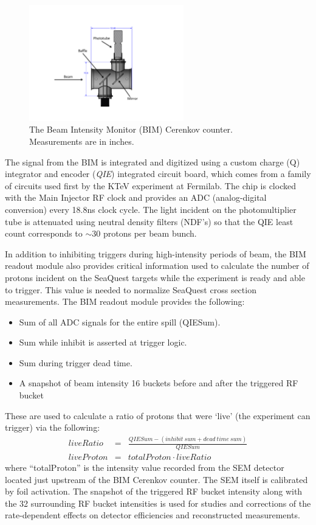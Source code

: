 \begin{figure}
	\begin{center}
		\includegraphics[width=0.6\textwidth]{figures/BIMCerenkov.pdf}
		\caption{The Beam Intensity Monitor (BIM) Cerenkov counter. Measurements are in inches.}
		\label{fig:BIMCerenkov}
	\end{center}
\end{figure}

The signal from the BIM is integrated and digitized using a custom charge (Q) integrator and encoder (\emph{QIE}) integrated circuit board, which comes from a family of circuits used first by the KTeV experiment at Fermilab\cite{QIE}. The chip is clocked with the Main Injector RF clock and provides an ADC (analog-digital conversion) every 18.8ns clock cycle. The light incident on
the photomultiplier tube is attenuated using neutral density filters (NDF's) so that the QIE least count corresponds to
$\sim$30 protons per beam bunch.

In addition to inhibiting triggers during high-intensity periods of beam, the BIM readout module also provides critical
information used to calculate the number of protons incident on the SeaQuest targets while the experiment is ready
and able to trigger. This value is needed to normalize SeaQuest cross section measurements. The BIM readout module provides the following:
\begin{itemize}
\item Sum of all ADC signals for the entire spill (QIESum).
\item Sum while inhibit is asserted at trigger logic.
\item Sum during trigger dead time.
\item A snapshot of beam intensity 16 buckets before and after the triggered RF bucket
\end{itemize}

These are used to calculate a ratio of protons that were `live' (the experiment can trigger) via the following:
\begin{eqnarray}
	liveRatio & = & \frac{QIESum - (inhibit\ sum + dead\ time\ sum)}{QIESum} \\
	liveProton & = & totalProton \cdot liveRatio
	\label{eqn:liveproton}
\end{eqnarray}
where ``totalProton'' is the intensity value recorded from the SEM detector located just upstream of the BIM Cerenkov counter.
The SEM itself is calibrated by foil activation. The snapshot of the triggered RF bucket intensity along with the 32
surrounding RF bucket intensities is used for studies and corrections of the rate-dependent effects on detector efficiencies
and reconstructed measurements.


